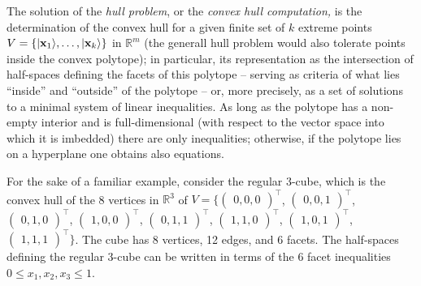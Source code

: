 The solution of the  {\em hull problem}, or the
{\em convex hull computation,}
is the determination of the convex hull for a given finite set of
$k$ extreme points $V = \{ \vert  {\bf x}_1 \rangle  , \ldots , \vert  {\bf x}_k \rangle \}$ in $\mathbb{R}^m$
(the generall hull problem would also tolerate points inside the convex polytope);
in particular, its representation as the intersection of half-spaces defining the facets of this polytope
-- serving as criteria of what lies ``inside'' and ``outside'' of the polytope -- or,
more precisely, as a set of solutions to a minimal system of linear inequalities.
As long as the polytope has a non-empty interior and is full-dimensional
(with respect to the vector space into which it is imbedded)
 there are only inequalities;
otherwise, if the polytope lies on a hyperplane one obtains also equations.


For the sake of a familiar example, consider the regular 3-cube,
which is the convex hull of the 8 vertices in  $\mathbb{R}^3$  of
$V= \big\{
\begin{pmatrix}0, 0, 0\end{pmatrix}^\intercal$,   $
\begin{pmatrix}0, 0, 1\end{pmatrix}^\intercal$,   $
\begin{pmatrix}0, 1, 0\end{pmatrix}^\intercal$,   $
\begin{pmatrix}1, 0, 0\end{pmatrix}^\intercal$,   $
\begin{pmatrix}0, 1, 1\end{pmatrix}^\intercal$,   $
\begin{pmatrix}1, 1, 0\end{pmatrix}^\intercal$,   $
\begin{pmatrix}1, 0, 1\end{pmatrix}^\intercal$,   $
\begin{pmatrix}1, 1, 1\end{pmatrix}^\intercal
\big\}
$.
The cube has 8 vertices, 12 edges, and 6 facets.
The half-spaces defining the  regular 3-cube can be written in terms of the 6 facet inequalities
$0 \le x_1,x_2,x_3 \le 1$.



